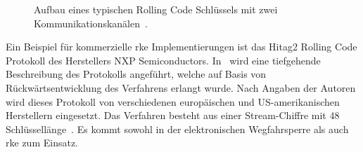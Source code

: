 \begin{figure}
    \caption[Aufbau eines typischen \foreignlanguage{english}{Rolling Code}  Schlüssels mit zwei Kommunikationskanälen.]{Aufbau eines typischen \foreignlanguage{english}{Rolling Code}  Schlüssels mit zwei Kommunikationskanälen~\cite{Garcia2016}.\label{fig:rolling_code_key_components}}
\end{figure}

Ein Beispiel für kommerzielle \gls{rke} Implementierungen ist das Hitag2 \foreignlanguage{english}{Rolling Code} Protokoll des Herstellers NXP Semiconductors. In~\cite{Garcia2016} wird eine tiefgehende Beschreibung des Protokolls angeführt, welche auf Basis von Rückwärtsentwicklung des Verfahrens erlangt wurde. Nach Angaben der Autoren wird dieses Protokoll von verschiedenen europäischen und US-amerikanischen Herstellern eingesetzt. Das Verfahren besteht aus einer Stream-Chiffre mit \SI{48}{\bit} Schlüssellänge~\cite{Verdult2015}. Es kommt sowohl in der elektronischen Wegfahrsperre als auch \gls{rke} zum Einsatz.


